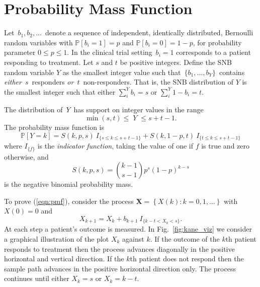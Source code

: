 \documentclass[review]{elsarticle}
\begin{document}
\section{Probability Mass Function}
\label{notation.section}

Let $\,b_1, b_2, \ldots \,$ denote a sequence of independent, identically
distributed, Bernoulli random variables with $\mathbb{P}[b_i=1]=p$ and
$\mathbb{P}[b_i = 0] = 1-p$, for
probability parameter $0\leq p \leq 1$. In the clinical trial setting
$\,b_i = 1$ corresponds to a patient responding to treatment.  
Let $s$ and $t$ be positive integers.  Define the SNB random
variable $Y$ as the smallest
integer value such that $\,\{b_1, \ldots , b_Y\}\,$ contains {\em either}
$\,s\,$ responders {\em or} $\,t\,$ non-responders. That is, the SNB 
distribution of $Y$ is the smallest integer such that either
$\sum_i^Y b_i = s$ or $\sum_i^Y 1-b_i = t$.

The distribution of $\,Y\,$ has support on integer values in the range
\begin{equation*}               
     \min(s,t) \leq \; Y \;\leq s+t-1  \label{range.y.eq}.
\end{equation*}
The probability mass function is
\begin{equation} \label{eqn:pmf}
\mathbb{P} [Y=k] = S(k, p, s) \ I_{\{s \leq k \leq s+t-1\}} + 
  S(k, 1-p, t) \ I_{\{ t \leq k \leq s+t-1 \}}
\end{equation}
where $I_{\{f\}}$ is the {\em indicator function}, taking the value 
of one if $f$ is true and zero otherwise, and
\begin{equation} \label{eqn:N}
S(k, p, s) = {k-1 \choose s-1} p^s (1-p)^{k-s} 
\end{equation}
is the negative binomial probability mass.

To prove (\ref{eqn:pmf}), consider the
process $\mathbf{X} = \left\{X(k) : k = 0,1,... \right\}$
with $X(0)=0$ and
\begin{equation*} \label{eqn:proc}
X_{k+1} = X_k + b_{k+1} \ I_{\{ k-t < X_k < s\}}.
\end{equation*}
At each step a patient's outcome is measured. In Fig.~\ref{fig:kane_viz} 
we consider a graphical illustration of the plot $X_k$ against
$k$. If the outcome of the $k$th patient responds to treatment then the process 
advances diagonally in the positive horizontal and vertical direction. 
If the $k$th patient does not respond
then the sample path advances in the positive horizontal direction only. The
process continues until either $X_k = s$ or $X_k = k-t$.
\end{document}
